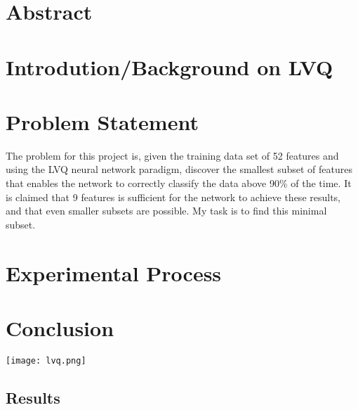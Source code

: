 \documentclass[12pt]{article}
\begin{document}
\maketitle

\section{Abstract}



\section{Introdution/Background on LVQ}



\section{Problem Statement}

The problem for this project is, given the training data set of 52 features and using the LVQ neural network paradigm, discover the smallest subset of features that enables the network to correctly classify the data above 90\% of the time.  It is claimed that 9 features is sufficient for the network to achieve these results, and that even smaller subsets are possible.  My task is to find this minimal subset.

\section{Experimental Process}



\section{Conclusion}



\begin{center}
\texttt{[image: lvq.png]}
\end{center}

\subsection{Results}
\end{document}
